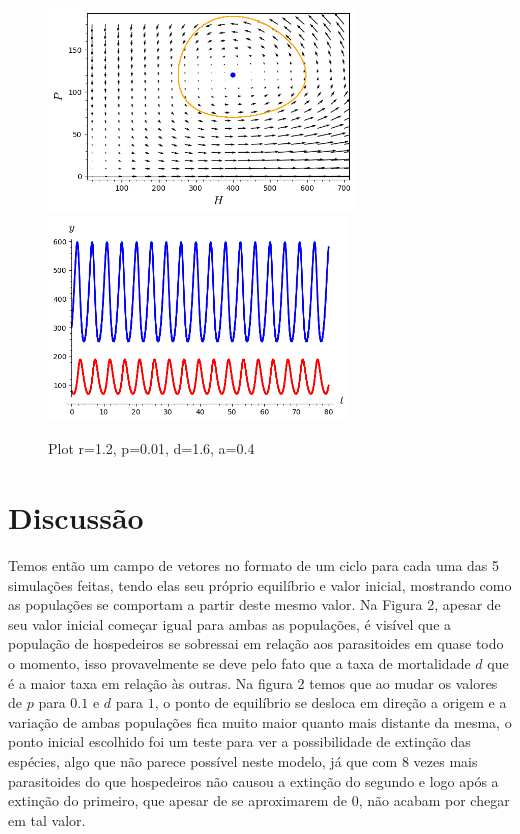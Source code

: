 \begin{figure}[h!]
\begin{center}
	\includegraphics[height=5.4cm]{Img/HP (r=1.2,p=0.01, d=1.6,a=0.4); (300, 80); (400, 120).png} \quad
	\includegraphics[height=5.4cm]{Img/T (r=1.2,p=0.01, d=1.6,a=0.4); (300, 80); (400, 120).png}
\caption{Plot r=1.2, p=0.01, d=1.6, a=0.4} \label{gdimotes}
\end{center}
\end{figure}

\newpage
        
\section{Discussão}
Temos então um campo de vetores no formato de um ciclo para cada uma das 5 simulações feitas, tendo elas seu próprio equilíbrio e valor inicial, mostrando como as populações se comportam a partir deste mesmo valor. Na Figura 2, apesar de seu valor inicial começar igual para ambas as populações, é visível que a população de hospedeiros se sobressai em relação aos parasitoides em quase todo o momento, isso provavelmente se deve pelo fato que a taxa de mortalidade $d$ que é a maior taxa em relação às outras. Na figura 2 temos que ao mudar os valores de $p$ para $0.1$ e $d$ para $1$, o ponto de equilíbrio se desloca em direção a origem e a variação de ambas populações fica muito maior quanto mais distante da mesma, o ponto inicial escolhido foi um teste para ver a possibilidade de extinção das espécies, algo que não parece possível neste modelo, já que com 8 vezes mais parasitoides do que hospedeiros não causou a extinção do segundo e logo após a extinção do primeiro, que apesar de se aproximarem de 0, não acabam por chegar em tal valor.

